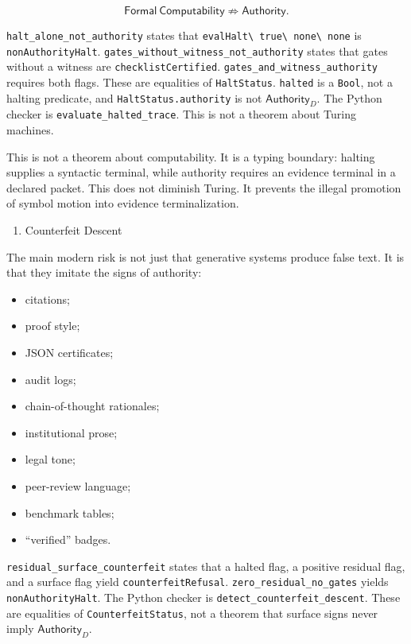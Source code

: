 \documentclass[
  10pt,
]{article}
\providecommand{\tightlist}{%
  \setlength{\itemsep}{0pt}\setlength{\parskip}{0pt}}
\providecommand{\tightlist}{%
  \setlength{\itemsep}{0pt}\setlength{\parskip}{0pt}}
\DeclareRobustCommand{\texttt}[1]{{\paperSymbolFont\nolinkurl{#1}}}
\begin{document}
\protect\hypertarget{math-E0157-0212}{}{\[
\boxed{
\mathsf{Formal\ Computability}
\not\Rightarrow
\mathsf{Authority}.
}
\]}

\texttt{halt\_alone\_not\_authority} states that \texttt{evalHalt\ true\ none\ none} is \texttt{nonAuthorityHalt}. \texttt{gates\_without\_witness\_not\_authority} states that gates without a witness are \texttt{checklistCertified}. \texttt{gates\_and\_witness\_authority} requires both flags. These are equalities of \texttt{HaltStatus}. \texttt{halted} is a \texttt{Bool}, not a halting predicate, and \texttt{HaltStatus.authority} is not \protect\hypertarget{math-E0010-0213}{}{\(\mathsf{Authority}_D\)}. The Python checker is \texttt{evaluate\_halted\_trace}. This is not a theorem about Turing machines.

This is not a theorem about computability. It is a typing boundary: halting supplies a syntactic terminal, while authority requires an evidence terminal in a declared packet. This does not diminish Turing. It prevents the illegal promotion of symbol motion into evidence terminalization.

\begin{enumerate}
\def\labelenumi{\arabic{enumi}.}
\setcounter{enumi}{13}
\tightlist
\item
  Counterfeit Descent
\end{enumerate}

The main modern risk is not just that generative systems produce false text. It is that they imitate the signs of authority:

\begin{itemize}
\tightlist
\item
  citations;
\item
  proof style;
\item
  JSON certificates;
\item
  audit logs;
\item
  chain-of-thought rationales;
\item
  institutional prose;
\item
  legal tone;
\item
  peer-review language;
\item
  benchmark tables;
\item
  ``verified'' badges.
\end{itemize}

\texttt{residual\_surface\_counterfeit} states that a halted flag, a positive residual flag, and a surface flag yield \texttt{counterfeitRefusal}. \texttt{zero\_residual\_no\_gates} yields \texttt{nonAuthorityHalt}. The Python checker is \texttt{detect\_counterfeit\_descent}. These are equalities of \texttt{CounterfeitStatus}, not a theorem that surface signs never imply \protect\hypertarget{math-E0010-0214}{}{\(\mathsf{Authority}_D\)}.
\end{document}
